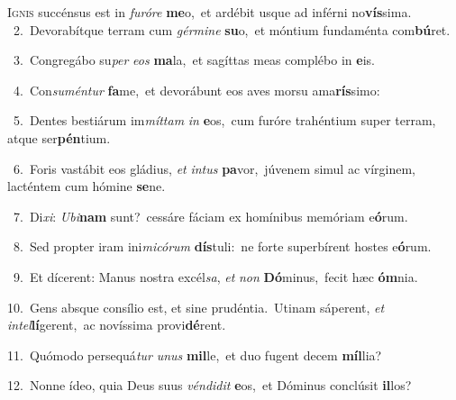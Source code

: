 \lettrine{\initial\textcolor{\initialcolor}{I}}{gnis} succénsus est in \textit{fu}\-\textit{ró}\textit{re} \textbf{me}\-o,~\star et ardébit usque ad inférni no\-\textbf{vís}\-sima.\\
{\numbfont\textcolor{\numbcolor}{~2.}}~Devorabítque terram cum \textit{gér}\-\textit{mi}\textit{ne} \textbf{su}\-o,~\star et móntium fundaménta com\-\textbf{bú}\-ret.\par
{\numbfont\textcolor{\numbcolor}{~3.}}~Congregábo su\textit{per} \textit{e}\-\textit{os} \textbf{ma}\-la,~\star et sagíttas meas complébo in \textbf{e}\-is.\par
{\numbfont\textcolor{\numbcolor}{~4.}}~Con\-\textit{su}\-\textit{mén}\textit{tur} \textbf{fa}\-me,~\star et devorábunt eos aves morsu ama\-\textbf{rís}\-simo:\par
{\numbfont\textcolor{\numbcolor}{~5.}}~Dentes bestiárum im\-\textit{mít}\-\textit{tam} \textit{in} \textbf{e}\-os,~\star cum furóre trahéntium super terram, atque ser\-\textbf{pén}\-tium.\par
{\numbfont\textcolor{\numbcolor}{~6.}}~Foris vastábit eos gládius, \textit{et} \textit{in}\-\textit{tus} \textbf{pa}\-vor,~\star júvenem simul ac vírginem, lacténtem cum hómine \textbf{se}\-ne.\par
{\numbfont\textcolor{\numbcolor}{~7.}}~Di\-\textit{xi}\-: \textit{U}\-\textit{bi}\textbf{nam} sunt?~\star cessáre fáciam ex homínibus memóriam e\-\textbf{ó}\-rum.\par
{\numbfont\textcolor{\numbcolor}{~8.}}~Sed propter iram ini\-\textit{mi}\-\textit{có}\textit{rum} \textbf{dís}\-tuli:~\star ne forte superbírent hostes e\-\textbf{ó}\-rum.\par
{\numbfont\textcolor{\numbcolor}{~9.}}~Et dícerent: Manus nostra excél\-\textit{sa}\-, \textit{et} \textit{non} \textbf{Dó}\-minus,~\star fecit hæc \textbf{óm}\-nia.\par
{\numbfont\textcolor{\numbcolor}{10.}}~Gens absque consílio est, et sine prudéntia.~\dagger Utinam sáperent, \textit{et} \textit{in}\-\textit{tel}\textbf{lí}gerent,~\star ac novíssima provi\-\textbf{dé}\-rent.\par
{\numbfont\textcolor{\numbcolor}{11.}}~Quómodo persequá\textit{tur} \textit{u}\-\textit{nus} \textbf{mil}\-le,~\star et duo fugent decem \textbf{míl}\-lia?\par
{\numbfont\textcolor{\numbcolor}{12.}}~Nonne ídeo, quia Deus suus \textit{vén}\-\textit{di}\textit{dit} \textbf{e}\-os,~\star et Dóminus conclúsit \textbf{il}\-los?\par
